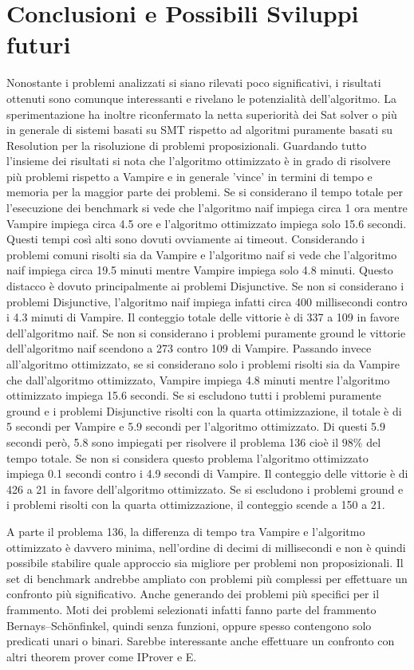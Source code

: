 \documentclass[./main.tex]{subfiles}
\begin{document}
\section{Conclusioni e Possibili Sviluppi futuri}
Nonostante i problemi analizzati si siano rilevati poco significativi, 
i risultati ottenuti sono comunque interessanti e rivelano le potenzialità dell'algoritmo.
La sperimentazione ha inoltre riconfermato la netta superiorità dei Sat solver o più in generale di sistemi 
basati su SMT rispetto ad algoritmi puramente basati su Resolution per la risoluzione di problemi proposizionali.
Guardando tutto l'insieme dei risultati si nota che l'algoritmo ottimizzato è in grado di risolvere più problemi rispetto a Vampire 
e in generale 'vince' in termini di tempo e memoria per la maggior parte dei problemi.
Se si considerano il tempo totale per l'esecuzione dei benchmark si vede che l'algoritmo naif impiega circa 1 ora 
mentre Vampire impiega circa 4.5 ore e l'algoritmo ottimizzato impiega solo 15.6 secondi.
Questi tempi così alti sono dovuti ovviamente ai timeout.
Considerando i problemi comuni risolti sia da Vampire e l'algoritmo naif si vede che l'algoritmo naif impiega
circa 19.5 minuti mentre Vampire impiega solo 4.8 minuti. 
Questo distacco è dovuto principalmente ai problemi Disjunctive. 
Se non si considerano i problemi Disjunctive, l'algoritmo naif impiega infatti circa 400 millisecondi contro i 4.3 minuti di Vampire.
Il conteggio totale delle vittorie è di 337 a 109 in favore dell'algoritmo naif.
Se non si considerano i problemi puramente ground le vittorie dell'algoritmo naif scendono a 273 contro 109 di Vampire.
Passando invece all'algoritmo ottimizzato, se si considerano solo i problemi risolti sia da Vampire che dall'algoritmo ottimizzato,
Vampire impiega 4.8 minuti mentre l'algoritmo ottimizzato impiega 15.6 secondi.
Se si escludono tutti i problemi puramente ground e i problemi Disjunctive risolti con la quarta ottimizzazione,
il totale è di 5 secondi per Vampire e 5.9 secondi per l'algoritmo ottimizzato.
Di questi 5.9 secondi però, 5.8 sono impiegati per risolvere il problema 136 cioè il $98\%$ del tempo totale.  
Se non si considera questo problema l'algoritmo ottimizzato impiega 0.1 secondi contro i 4.9 secondi di Vampire.
Il conteggio delle vittorie è di 426 a 21 in favore dell'algoritmo ottimizzato. 
Se si escludono i problemi ground e i problemi risolti con la quarta ottimizzazione, il conteggio scende a 150 a 21.

A parte il problema 136, la differenza di tempo tra Vampire e l'algoritmo ottimizzato è davvero minima, nell'ordine di 
decimi di millisecondi e non è quindi possibile stabilire quale approccio sia migliore per problemi non proposizionali.
Il set di benchmark andrebbe ampliato con problemi più complessi per effettuare un confronto più significativo.
Anche generando dei problemi più specifici per il frammento.
Moti dei problemi selezionati infatti fanno parte del frammento Bernays–Schönfinkel, quindi senza funzioni, oppure
spesso contengono solo predicati unari o binari.
Sarebbe interessante anche effettuare un confronto con altri theorem prover come IProver e E.
\end{document}
